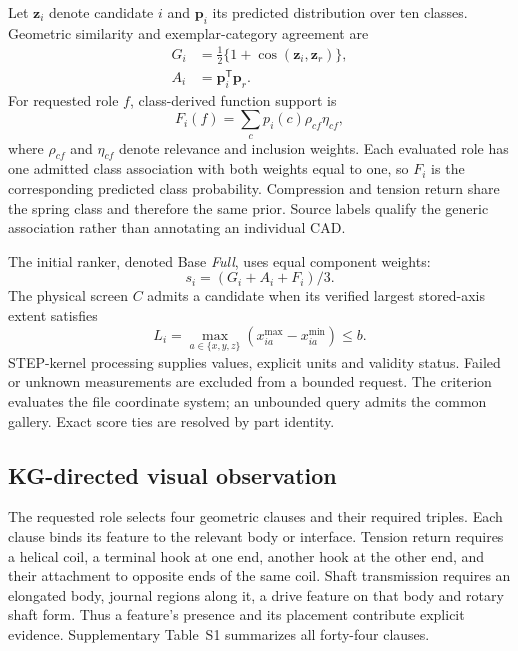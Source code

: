 \documentclass[10pt,a4paper,twocolumn]{article}
\newcommand{\Full}{\textit{Full}}
\begin{document}
Let $\boldsymbol z_i$ denote candidate $i$ and $\boldsymbol p_i$ its predicted distribution over ten classes. Geometric similarity and exemplar-category agreement are
\begin{align}
G_i&=\tfrac12\{1+\cos(\boldsymbol z_i,\boldsymbol z_r)\},\label{eq:geometry}\\
A_i&=\boldsymbol p_i^{\mathsf T}\boldsymbol p_r.\label{eq:agreement}
\end{align}
For requested role $f$, class-derived function support is
\begin{equation}
F_i(f)=\sum_c p_i(c)\rho_{cf}\eta_{cf},\label{eq:function}
\end{equation}
where $\rho_{cf}$ and $\eta_{cf}$ denote relevance and inclusion weights. Each evaluated role has one admitted class association with both weights equal to one, so $F_i$ is the corresponding predicted class probability. Compression and tension return share the spring class and therefore the same prior. Source labels qualify the generic association rather than annotating an individual CAD.

The initial ranker, denoted Base \Full, uses equal component weights:
\begin{equation}
s_i=(G_i+A_i+F_i)/3.\label{eq:base}
\end{equation}
The physical screen $C$ admits a candidate when its verified largest stored-axis extent satisfies
\begin{equation}
L_i=\max_{a\in\{x,y,z\}}(x^{\max}_{ia}-x^{\min}_{ia})\leq b.\label{eq:extent}
\end{equation}
STEP-kernel processing supplies values, explicit units and validity status. Failed or unknown measurements are excluded from a bounded request. The criterion evaluates the file coordinate system; an unbounded query admits the common gallery. Exact score ties are resolved by part identity.

\subsection{KG-directed visual observation}

The requested role selects four geometric clauses and their required triples. Each clause binds its feature to the relevant body or interface. Tension return requires a helical coil, a terminal hook at one end, another hook at the other end, and their attachment to opposite ends of the same coil. Shaft transmission requires an elongated body, journal regions along it, a drive feature on that body and rotary shaft form. Thus a feature's presence and its placement contribute explicit evidence. Supplementary Table~S1 summarizes all forty-four clauses.
\end{document}
